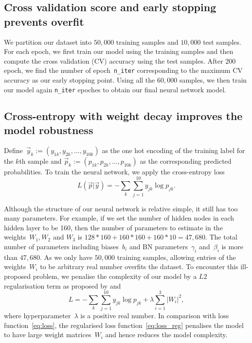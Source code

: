 \subsection{Cross validation score and early stopping prevents overfit\label{sec:early}}
We partition our dataset into $50,000$ training samples and $10,000$ test samples. For each epoch, we first train our model using the training samples and then compute the cross validation (CV) accuracy using the test samples. After $200$ epoch, we find the number of epoch~\texttt{n\_iter} corresponding to the maximum CV accuracy as our early stopping point. Using all the $60,000$ samples, we then train our model again  \texttt{n\_iter} epoches to obtain our final neural network model.

\subsection{Cross-entropy with weight decay improves the model robustness}
Define~$\vec y_k:=(y_{1k},y_{2k},\ldots,y_{10k})$ as the one hot encoding of the training label for the $k$th sample and $\vec p_k:=(p_{1k},p_{2k},\ldots,p_{10k})$ as the corresponding predicted probabilities. To train the neural network, we apply the cross-entropy loss 
\begin{equation}
  {L(\vec p|\vec y)=-\sum_{k}\sum _{j=1}^{10} y_{jk}\log p_{jk}}.  \label{eq:loss}
\end{equation}

Although the structure of our neural network is relative simple, it still has too many parameters. For example, if we set the number of hidden nodes in each hidden layer to be 160, then the number of parameters to estimate in the weights~$W_1,W_2$ and $W_3$ is $128*160+160*160+160*10=47,680$. The total number of parameters including biases~$b_i$ and BN parameters~$\gamma_i$ and~$\beta_i$ is more than $47,680$. As we only have $50,000$ training samples, allowing entries of the weights~$W_i$ to be arbitrary real number overfits the dataset. To encounter this ill-proposed problem, we penalise the complexity of our model by a $L2$ regularisation term as proposed by \citet{NIPS1991563} and \citet{doi:10.1080/00401706.1970.10488634}
\begin{equation}
  {L=-\sum_k\sum _{j=1}^{10} y_{jk}\log p_{jk}}+\lambda\sum _{i=1}^3\left|W_i\right|^2,  \label{eq:loss_reg}
\end{equation}
where hyperparameter~$\lambda$ is a positive real number.
In comparison with loss function~\eqref{eq:loss}, the regularised loss function~\eqref{eq:loss_reg} penalises the model to have large weight matrices~$W_i$ and hence reduces the model complexity.

